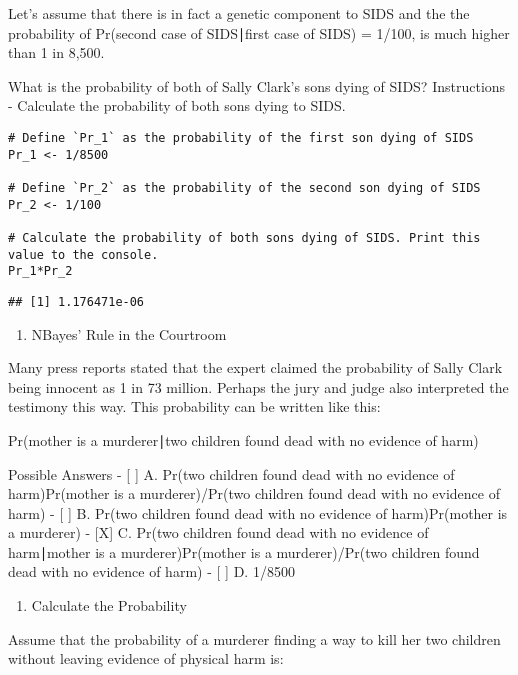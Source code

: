 \documentclass[
]{article}
\providecommand{\tightlist}{%
  \setlength{\itemsep}{0pt}\setlength{\parskip}{0pt}}
\begin{document}
Let's assume that there is in fact a genetic component to SIDS and the
the probability of Pr(second case of SIDS∣first case of SIDS) = 1/100,
is much higher than 1 in 8,500.

What is the probability of both of Sally Clark's sons dying of SIDS?
Instructions - Calculate the probability of both sons dying to SIDS.

\begin{verbatim}
# Define `Pr_1` as the probability of the first son dying of SIDS
Pr_1 <- 1/8500

# Define `Pr_2` as the probability of the second son dying of SIDS
Pr_2 <- 1/100

# Calculate the probability of both sons dying of SIDS. Print this value to the console.
Pr_1*Pr_2
\end{verbatim}

\begin{verbatim}
## [1] 1.176471e-06
\end{verbatim}

\begin{enumerate}
\def\labelenumi{\arabic{enumi}.}
\setcounter{enumi}{2}
\tightlist
\item
  NBayes' Rule in the Courtroom
\end{enumerate}

Many press reports stated that the expert claimed the probability of
Sally Clark being innocent as 1 in 73 million. Perhaps the jury and
judge also interpreted the testimony this way. This probability can be
written like this:

Pr(mother is a murderer∣two children found dead with no evidence of
harm)

Possible Answers - {[} {]} A. Pr(two children found dead with no
evidence of harm)Pr(mother is a murderer)/Pr(two children found dead
with no evidence of harm) - {[} {]} B. Pr(two children found dead with
no evidence of harm)Pr(mother is a murderer) - {[}X{]} C. Pr(two
children found dead with no evidence of harm∣mother is a
murderer)Pr(mother is a murderer)/Pr(two children found dead with no
evidence of harm) - {[} {]} D. 1/8500

\begin{enumerate}
\def\labelenumi{\arabic{enumi}.}
\setcounter{enumi}{3}
\tightlist
\item
  Calculate the Probability
\end{enumerate}

Assume that the probability of a murderer finding a way to kill her two
children without leaving evidence of physical harm is:
\end{document}
